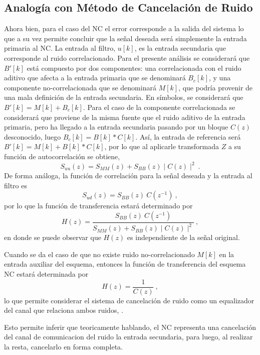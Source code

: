 \subsection{Analogía con Método de Cancelación de Ruido}
Ahora bien, para el caso del \ac{NC} el error corresponde a la salida del sistema lo que a su vez permite concluir que la señal deseada será simplemente la entrada primaria al \ac{NC}. La entrada al filtro, $u[k]$, es la entrada secundaria que corresponde al ruido correlacionado. Para el presente análisis se considerará que $B'[k]$ está compuesto por dos componentes: una correlacionada con el ruido aditivo que afecta a la entrada primaria que se denominará $B_c[k]$, y una componente no-correlacionada que se denominará $M[k]$, que podría provenir de una mala definición de la entrada secundaria. En símbolos, se considerará que $B'[k] = M[k] + B_c[k]$. Para el caso de la componente correlacionada se considerará que proviene de la misma fuente que el ruido aditivo de la entrada primaria, pero ha llegado a la entrada secundaria pasando por un bloque $C(z)$ desconocido, luego $B_c[k] = B[k]\ast C[k]$. Así, la entrada de referencia será $B'[k] = M[k] + B[k]\ast C[k]$, por lo que al aplicarle transformada $Z$ a su función de autocorrelación se obtiene, \cite{}
\begin{equation}
 S_{uu}(z) = S_{MM}(z) + S_{BB}(z)\mid C(z)\mid^2~.
\end{equation}
De forma análoga, la función de correlación para la señal deseada y la entrada al filtro es
\begin{equation}
 S_{ud}(z) = S_{BB}(z)~C\left( z^{-1}\right)~,
\end{equation}
por lo que la función de transferencia estará determinado por
\begin{equation}
  H(z) = \frac{S_{BB}(z)~C\left( z^{-1}\right)}{S_{MM}(z) + S_{BB}(z)\mid C(z)\mid^2}~,
\end{equation}
en donde se puede observar que $H(z)$ es independiente de la señal original.

Cuando se da el caso de que no existe ruido no-correlacionado $M[k]$ en la entrada auxiliar del esquema, entonces la función de transferencia del esquema \ac{NC} estará determinada por
$$H(z) = \frac{1}{C(z)}~,$$
lo que permite considerar el sistema de cancelación de ruido como un equalizador del canal que relaciona ambos ruidos, \cite{widrow75-ncs}.

Esto permite inferir que teoricamente hablando, el NC representa una cancelación del canal de comunicacion del ruido la entrada secundaria, para luego, al realizar la resta, cancelarlo en forma completa.


